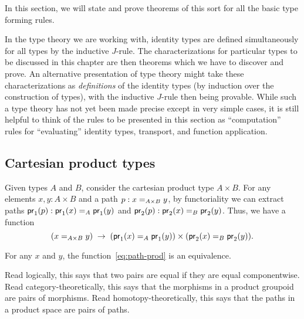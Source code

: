 In this section, we will state and prove theorems of this sort for all the basic type forming rules.

\begin{rmk}\label{rmk:computational-hope}
  In the type theory we are working with, identity types are defined simultaneously for all types by the inductive $J$-rule.
  The characterizations for particular types to be discussed in this chapter are then theorems which we have to discover and prove.
  An alternative presentation of type theory might take these characterizations as \emph{definitions} of the identity types (by induction over the construction of types), with the inductive $J$-rule then being provable.
  While such a type theory has not yet been made precise except in very simple cases, it is still helpful to think of the rules to be presented in this section as ``computation'' rules for ``evaluating'' identity types, transport, and function application.
\end{rmk}

\subsection{Cartesian product types}
\label{sec:compute-cartprod}

Given types $A$ and $B$, consider the cartesian product type $A \times B$.  
For any elements $x,y:A\times B$ and a path $p:\id[A\times B]{x}{y}$, by functoriality we can extract paths $\ap{\proj1}p:\id[A]{\proj1(x)}{\proj1(y)}$ and $\ap{\proj2}p:\id[B]{\proj2(x)}{\proj2(y)}$.
Thus, we have a function
\begin{equation}
  (\id[A\times B]{x}{y}) \;\to\; (\id[A]{\proj1(x)}{\proj1(y)}) \times (\id[B]{\proj2(x)}{\proj2(y)}).\label{eq:path-prod}
\end{equation}

\begin{thm}\label{thm:path-prod}
  For any $x$ and $y$, the function~\eqref{eq:path-prod} is an equivalence.
\end{thm}

Read logically, this says that two pairs are equal if they are equal
componentwise.  Read category-theoretically, this says that the
morphisms in a product groupoid are pairs of morphisms.  Read
homotopy-theoretically, this says that the paths in a product
space are pairs of paths.

